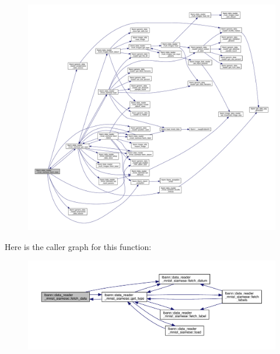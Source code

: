 \begin{figure}[H]
\begin{center}
\leavevmode
\includegraphics[width=350pt]{classlbann_1_1data__reader__mnist__siamese_ac44a7118e94338e14f7b6a9e33239155_cgraph}
\end{center}
\end{figure}
Here is the caller graph for this function\+:\nopagebreak
\begin{figure}[H]
\begin{center}
\leavevmode
\includegraphics[width=350pt]{classlbann_1_1data__reader__mnist__siamese_ac44a7118e94338e14f7b6a9e33239155_icgraph}
\end{center}
\end{figure}
\mbox{\label{classlbann_1_1data__reader__mnist__siamese_a299dd32be165c5acf320b6f40404cb17}} 
